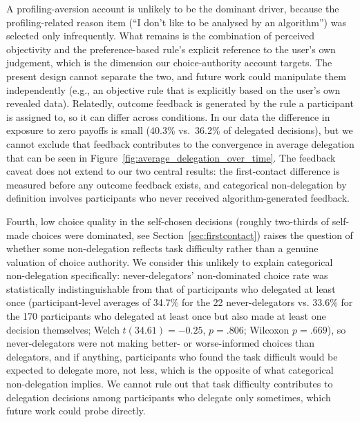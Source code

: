 \documentclass[a4paper, 12pt, fleqn]{article}
\theoremstyle{hypstyle}
\begin{document}
A profiling-aversion account is unlikely to be the dominant driver, because the profiling-related reason item (``I don't like to be analysed by an algorithm'') was selected only infrequently. What remains is the combination of perceived objectivity and the preference-based rule's explicit reference to the user's own judgement, which is the dimension our choice-authority account targets. The present design cannot separate the two, and future work could manipulate them independently (e.g., an objective rule that is explicitly based on the user's own revealed data). Relatedly, outcome feedback is generated by the rule a participant is assigned to, so it can differ across conditions. In our data the difference in exposure to zero payoffs is small (40.3\% vs.\ 36.2\% of delegated decisions), but we cannot exclude that feedback contributes to the convergence in average delegation that can be seen in Figure~\ref{fig:average_delegation_over_time}. The feedback caveat does not extend to our two central results: the first-contact difference is measured before any outcome feedback exists, and categorical non-delegation by definition involves participants who never received algorithm-generated feedback. 

Fourth, low choice quality in the self-chosen decisions (roughly two-thirds of self-made choices were dominated, see Section~\ref{sec:firstcontact}) raises the question of whether some non-delegation reflects task difficulty rather than a genuine valuation of choice authority. We consider this unlikely to explain categorical non-delegation specifically: never-delegators' non-dominated choice rate was statistically indistinguishable from that of participants who delegated at least once (participant-level averages of 34.7\% for the 22 never-delegators vs. 33.6\% for the 170 participants who delegated at least once but also made at least one decision themselves; Welch $t(34.61) = -0.25$, $p = .806$; Wilcoxon $p = .669$), so never-delegators were not making better- or worse-informed choices than delegators, and if anything, participants who found the task difficult would be expected to delegate more, not less, which is the opposite of what categorical non-delegation implies. We cannot rule out that task difficulty contributes to delegation decisions among participants who delegate only sometimes, which future work could probe directly.
\end{document}
